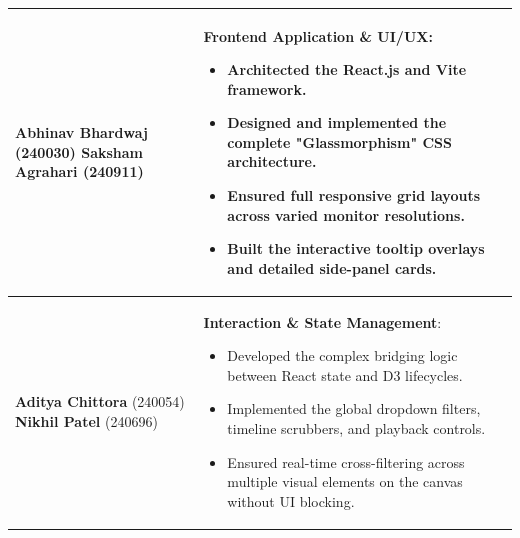 \documentclass[12pt,a4paper]{article}
\begin{document}
\begin{longtable}{|p{}|p{}|}
\textbf{Abhinav Bhardwaj} (240030) \newline \textbf{Saksham Agrahari} (240911) & \textbf{Frontend Application \& UI/UX}: 
\begin{itemize}
    \item Architected the React.js and Vite framework.
    \item Designed and implemented the complete "Glassmorphism" CSS architecture.
    \item Ensured full responsive grid layouts across varied monitor resolutions.
    \item Built the interactive tooltip overlays and detailed side-panel cards.
\end{itemize} \\
\midrule

\textbf{Aditya Chittora} (240054) \newline \textbf{Nikhil Patel} (240696) & \textbf{Interaction \& State Management}: 
\begin{itemize}
    \item Developed the complex bridging logic between React state and D3 lifecycles.
    \item Implemented the global dropdown filters, timeline scrubbers, and playback controls.
    \item Ensured real-time cross-filtering across multiple visual elements on the canvas without UI blocking.
\end{itemize} \\

\end{longtable}

\newpage
\end{document}
